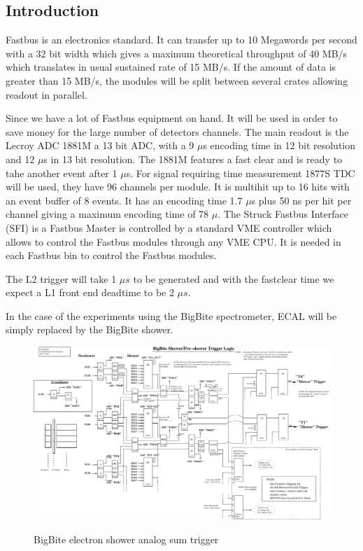 \documentclass{article}
\begin{document}
\subsection{Introduction}
Fastbus is an electronics standard. It can transfer up to 10 Megawords per second with a 32 bit width which gives a maximum theoretical throughput of 40 MB/s which translates in usual sustained rate of 15 MB/s. If the amount of data is greater than 15 MB/s, the modules will be split between several crates allowing readout in parallel.

Since we have a lot of Fastbus equipment on hand. It will be used in order to save money for the large number of detectors channels. The main readout is the Lecroy ADC 1881M a 13 bit ADC, with a 9 $\mu$s encoding time in 12 bit resolution and 12  $\mu$s in 13 bit resolution. The 1881M features a fast clear and is ready to tahe another event after 1 $\mu$s. For signal requiring time measurement 1877S TDC will be used, they have 96 channels per module. It is multihit up to 16 hits with an event buffer of 8 events. It has an encoding time  1.7 $\mu$s plus 50 ns per hit per channel giving a maximum encoding time of 78 $\mu$. 
The Struck Fastbus Interface (SFI) is a Fastbus Master is controlled by a standard VME controller which allows to control the Fastbus modules through any VME CPU. It is needed in each Fastbus bin to control the Fastbus modules.

The L2 trigger will take 1 $\mu s$ to be generated and with the fastclear time we expect a L1 front end deadtime to be 2 $\mu s$.




In the case of the experiments using the BigBite spectrometer, ECAL will be simply replaced by the BigBite shower.

\newpage
\begin{figure}
\includegraphics[scale=0.9,angle=270]{figs/Sh-PS_logic_v2A.pdf}\\
\caption {BigBite electron shower analog sum trigger \label{BBEtrig}}
\end{figure}
\newpage
\end{document}
